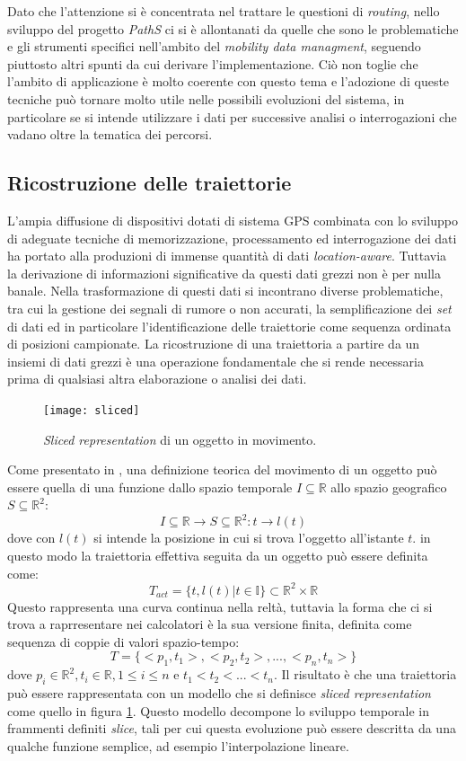 Dato che l'attenzione si è concentrata nel trattare le questioni di \emph{routing}, nello sviluppo del progetto \emph{PathS} ci si è allontanati da quelle che sono le problematiche e gli strumenti specifici nell'ambito del \emph{mobility data managment}, seguendo piuttosto altri spunti da cui derivare l'implementazione. Ciò non toglie che l'ambito di applicazione è molto coerente con questo tema e l'adozione di queste tecniche può tornare molto utile nelle possibili evoluzioni del sistema, in particolare se si intende utilizzare i dati per successive analisi o interrogazioni che vadano oltre la tematica dei percorsi.

\subsection{Ricostruzione delle traiettorie}
L'ampia diffusione di dispositivi dotati di sistema GPS combinata con lo sviluppo di adeguate tecniche di memorizzazione, processamento ed interrogazione dei dati ha portato alla produzioni di immense quantità di dati \emph{location-aware}. Tuttavia la derivazione di informazioni significative da questi dati grezzi non è per nulla banale. Nella trasformazione di questi dati si incontrano diverse problematiche, tra cui la gestione dei segnali di rumore o non accurati, la semplificazione dei \emph{set} di dati ed in particolare l'identificazione delle traiettorie come sequenza ordinata di posizioni campionate.
La ricostruzione di una traiettoria a partire da un insiemi di dati grezzi è una operazione fondamentale che si rende necessaria prima di qualsiasi altra elaborazione o analisi dei dati.

\begin{figure}[h]
  \centering
  \texttt{[image: sliced]}
  \caption{\footnotesize{\emph{Sliced representation} di un oggetto in movimento.}}
  \label{fig:sliced}
\end{figure}
Come presentato in \cite[capitolo~3.1]{mdme}, una definizione teorica del movimento di un oggetto può essere quella di una funzione dallo spazio temporale $I\subseteq\mathbb{R}$ allo spazio geografico $S\subseteq\mathbb{R}^2$:
$$I\subseteq\mathbb{R} \rightarrow S\subseteq\mathbb{R}^2 : t \rightarrow l(t)$$
dove con $l(t)$ si intende la posizione in cui si trova l'oggetto all'istante $t$. in questo modo la traiettoria effettiva seguita da un oggetto può essere definita come:
$$T_{act} = \{t, l(t) | t\in\mathbb{I}\} \subset \mathbb{R}^2\times\mathbb{R}$$
Questo rappresenta una curva continua nella reltà, tuttavia la forma che ci si trova a raprresentare nei calcolatori è la sua versione finita, definita come sequenza di coppie di valori spazio-tempo:
$$T = \{<p_1, t_1>, <p_2, t_2>, ... , <p_n, t_n>\}$$
dove $p_i\in\mathbb{R}^2, t_i\in\mathbb{R}, 1 \leq i \leq n$ e $t_1 < t_2 < ... < t_n$.
Il risultato è che una traiettoria può essere rappresentata con un modello che si definisce \emph{sliced representation} come quello in figura \ref{fig:sliced}.
Questo modello decompone lo sviluppo temporale in frammenti definiti \emph{slice}, tali per cui questa evoluzione può essere descritta da una qualche funzione semplice, ad esempio l'interpolazione lineare.

